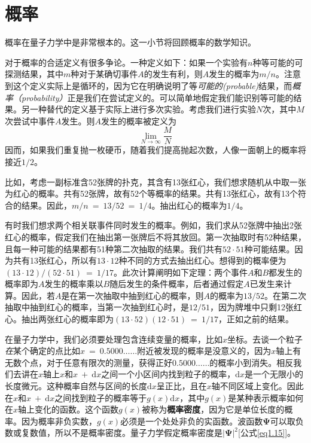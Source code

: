 \documentclass[12pt,a4paper,openany]{ctexbook}
\begin{document}
\section{概率}
\begin{flushleft}
    \setlength{\parindent}{2em}
概率在量子力学中是非常根本的。这一小节将回顾概率的数学知识。

对于概率的合适定义有很多争论。一种定义如下：如果一个实验有$n$种等可能的可探测结果，其中$m$种对于某确切事件$A$的发生有利，则$A$发生的概率为$m/n$。注意到这个定义实际上是循环的，因为它在明确说明了等\textit{可能的(probable)}结果，而\textit{概率（probability）}正是我们在尝试定义的。可以简单地假定我们能识别等可能的结果。另一种替代的定义基于实际上进行多次实验。考虑我们进行实验$N$次，其中$M$次尝试中事件$A$发生。则$A$发生的概率被定义为
\begin{equation*}
    \lim_{N\to \infty}\frac{M}{N}
\end{equation*}
因而，如果我们重复抛一枚硬币，随着我们提高抛起次数，人像一面朝上的概率将接近$1/2$。

比如，考虑一副标准含52张牌的扑克，其含有13张红心，我们想求随机从中取一张为红心的概率。共有52张牌，故有52个等概率的结果。共有13张红心，故有13个符合的结果。因此，$m/n\ =\ 13/52\ =\ 1/4$。抽出红心的概率为$1/4$。

有时我们想求两个相关联事件同时发生的概率。例如，我们求从52张牌中抽出2张红心的概率，假定我们在抽出第一张牌后不将其放回。第一次抽取时有52种结果，且每一种可能的结果都有51种第二次抽取的结果。我们共有$52\cdot51$种可能结果。因为共有13张红心，所以有$13\cdot12$种不同的方式去抽出红心。想得到的概率便为$(13\cdot12)/(52\cdot51)\ =\ 1/17$。此次计算阐明如下定理：两个事件$A$和$B$都发生的概率即为$A$发生的概率乘以$B$随后发生的条件概率，后者通过假定$A$已发生来计算。因此，若$A$是在第一次抽取中抽到红心的概率，则$A$的概率为$13/52$。在第二次抽取中抽到红心的概率，当第一次抽到红心时，是$12/51$，因为牌堆中只剩12张红心。抽出两张红心的概率即为$(13\cdot52)(12\cdot51)\ =\ 1/17$，正如之前的结果。

在量子力学中，我们必须要处理包含连续变量的概率，比如$x$坐标。去谈一个粒子\textit{在}某个确定的点比如$x\ =\ 0.5000……$附近被发现的概率是没意义的，因为$x$轴上有无数个点，对于任意有限次的测量，获得正好$0.5000……$的概率小到消失。相反我们去讲在$x$轴上$x$和$x\ +\ \mathrm{d}x$之间一个小区间内找到粒子的概率，$\mathrm{d}x$是一个无限小的长度微元。这种概率自然与区间的长度$\mathrm{d}x$呈正比，且在$x$轴不同区域上变化。因此在$x$和$x\ +\ \mathrm{d}x$之间找到粒子的概率等于$g(x)\mathrm{d}x$，其中$g(x)$是某种表示概率如何在$x$轴上变化的函数。这个函数$g(x)$被称为\textbf{概率密度}，因为它是单位长度的概率。因为概率非负实数，$g(x)$必须是一个处处非负的实函数。波函数$\bm{\Psi}$可以取负数或复数值，所以不是概率密度。量子力学假定概率密度是$\left|\bm{\Psi}\right|^2$[公式\eqref{eq1.15}]。


\end{flushleft}
\end{document}
